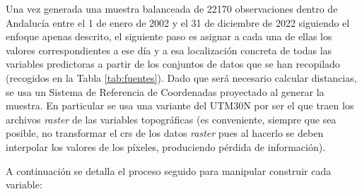 \documentclass[12pt,a4paper,]{book}
\numberwithin{dummy}{section}
\theoremstyle{ocrenumbox}
\theoremstyle{blacknumex}
\theoremstyle{blacknumbox}
\theoremstyle{ocrenum}
\theoremstyle{ocrenum}
\begin{document}
Una vez generada una muestra balanceada de 22170 observaciones dentro de
Andalucía entre el 1 de enero de 2002 y el 31 de diciembre de 2022
siguiendo el enfoque apenas descrito, el siguiente paso es asignar a
cada una de ellas los valores correspondientes a ese día y a esa
localización concreta de todas las variables predictoras a partir de los
conjuntos de datos que se han recopilado (recogidos en la Tabla
\ref{tab:fuentes}). Dado que será necesario calcular distancias, se usa
un Sistema de Referencia de Coordenadas proyectado al generar la
muestra. En particular se usa una variante del UTM30N por ser el que
traen los archivos \emph{raster} de las variables topográficas (es
conveniente, siempre que sea posible, no transformar el crs de los datos
\emph{raster} pues al hacerlo se deben interpolar los valores de los
píxeles, produciendo pérdida de información).

A continuación se detalla el proceso seguido para manipular construir
cada variable:
\end{document}

